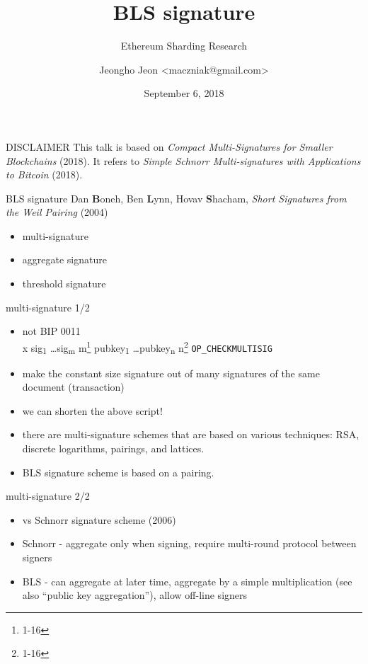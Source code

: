 \documentclass{beamer}
\title{BLS signature}
\subtitle{Ethereum Sharding Research}
\date{September 6, 2018}
\author{Jeongho Jeon <maczniak@gmail.com>}
\institute{\textbf{Whitepaper} Foundation, Nonce\\%
(for internal discussion purposes only)}
\begin{document}
\maketitle

\begin{frame}{DISCLAIMER}
This talk is based on \textit{Compact Multi-Signatures for Smaller Blockchains} (2018). It refers to \textit{Simple Schnorr Multi-signatures with Applications to Bitcoin} (2018).
\end{frame}

\begin{frame}{BLS signature}
Dan \textbf{B}oneh, Ben \textbf{L}ynn, Hovav \textbf{S}hacham, \textit{Short Signatures from the Weil Pairing} (2004)
\begin{itemize}
\item multi-signature
\item aggregate signature
\item threshold signature
\end{itemize}
\end{frame}

\begin{frame}{multi-signature 1/2}
\begin{itemize}
\item not BIP 0011\\x sig\textsubscript{1} \ldots sig\textsubscript{m} m\footnote{1-16} pubkey\textsubscript{1} \ldots pubkey\textsubscript{n} n\footnote{1-16} \texttt{OP\_CHECKMULTISIG}
\item make the constant size signature out of many signatures of the same document (transaction)
\item we can shorten the above script!
\item there are multi-signature schemes that are based on various techniques: RSA, discrete logarithms, pairings, and lattices.
\item BLS signature scheme is based on a pairing.
\end{itemize}
\end{frame}

\begin{frame}{multi-signature 2/2}
\begin{itemize}
\item vs Schnorr signature scheme (2006)
\item Schnorr - aggregate only when signing, require multi-round protocol between signers
\item BLS - can aggregate at later time, aggregate by a simple multiplication (see also ``public key aggregation''), allow off-line signers
\end{itemize}
\end{frame}
\end{document}
